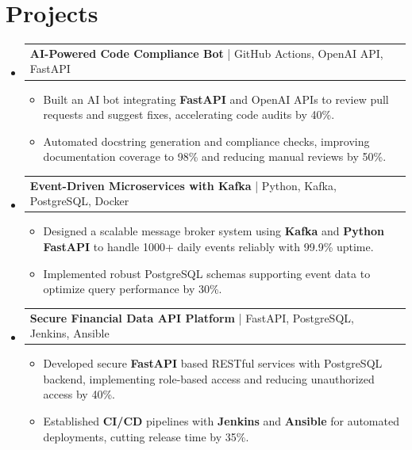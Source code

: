 \documentclass[letterpaper,11pt]{article}
\makeatletter
\newcommand{\resumeItem}[1]{
  \item\footnotesize{
    {#1 \vspace{-2pt}}
  }
}
\newcommand{\resumeProjectHeading}[2]{
    \item
    \begin{tabular*}{1.001\textwidth}{l@{\extracolsep{\fill}}r}
      \small#1 & \textbf{\small #2}\\
    \end{tabular*}\vspace{-7pt}
}
\newcommand{\resumeSubHeadingListStart}{\begin{itemize}[leftmargin=0pt, label={}]}
\newcommand{\resumeSubHeadingListEnd}{\end{itemize}}
\newcommand{\resumeItemListStart}{\begin{itemize}[leftmargin=*]}
\newcommand{\resumeItemListEnd}{\end{itemize}\vspace{-5pt}}
\makeatother
\begin{document}
\section{Projects}
    \vspace{-5pt}
    \resumeSubHeadingListStart
      \resumeProjectHeading
          {\textbf{AI-Powered Code Compliance Bot} | GitHub Actions, OpenAI API, FastAPI}{}
          \resumeItemListStart
              \resumeItem{Built an AI bot integrating \textbf{FastAPI} and OpenAI APIs to review pull requests and suggest fixes, accelerating code audits by 40\%.}
              \resumeItem{Automated docstring generation and compliance checks, improving documentation coverage to 98\% and reducing manual reviews by 50\%.}
          \resumeItemListEnd
          \vspace{-12pt}
      \resumeProjectHeading
          {\textbf{Event-Driven Microservices with Kafka} | Python, Kafka, PostgreSQL, Docker}{}
          \resumeItemListStart
              \resumeItem{Designed a scalable message broker system using \textbf{Kafka} and \textbf{Python FastAPI} to handle 1000+ daily events reliably with 99.9\% uptime.}
              \resumeItem{Implemented robust PostgreSQL schemas supporting event data to optimize query performance by 30\%.}
          \resumeItemListEnd
          \vspace{-12pt}
      \resumeProjectHeading
          {\textbf{Secure Financial Data API Platform} | FastAPI, PostgreSQL, Jenkins, Ansible}{}
          \resumeItemListStart
              \resumeItem{Developed secure \textbf{FastAPI} based RESTful services with PostgreSQL backend, implementing role-based access and reducing unauthorized access by 40\%.}
              \resumeItem{Established \textbf{CI/CD} pipelines with \textbf{Jenkins} and \textbf{Ansible} for automated deployments, cutting release time by 35\%.}
          \resumeItemListEnd 
    \resumeSubHeadingListEnd
\end{document}
